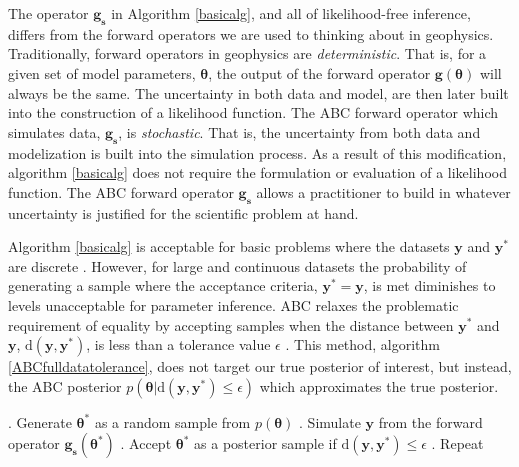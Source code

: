 The operator $\bm{g_s}$ in Algorithm \ref{basicalg}, and all of likelihood-free inference, differs from the forward operators we are used to thinking about in geophysics. Traditionally, forward operators in geophysics are \textit{deterministic}. That is, for a given set of model parameters, $\bm{\theta}$, the output of the forward operator $\bm{g}(\bm{\theta})$ will always be the same. The uncertainty in both data and model, are then later built into the construction of a likelihood function. The ABC forward operator which simulates data, $\bm{g_s}$, is \textit{stochastic}. That is, the uncertainty from both data and modelization is built into the simulation process. As a result of this modification, algorithm \ref{basicalg} does not require the formulation or evaluation of a likelihood function. The ABC forward operator $\bm{g_s}$ allows a practitioner to build in whatever uncertainty is justified for the scientific problem at hand. \par

Algorithm \ref{basicalg} is acceptable for basic problems where the datasets $\bm{y}$ and $\bm{y^*}$ are discrete \citep{Tavare1997,Fu1997}. However, for large and continuous datasets the probability of generating a sample where the acceptance criteria, $\bm{y^*} = \bm{y}$, is met diminishes to levels unacceptable for parameter inference. ABC relaxes the problematic requirement of equality by accepting samples when the distance between $\bm{y^*}$ and $\bm{y}$, $\text{d}(\bm{y},\bm{y^*})$, is less than a tolerance value $\epsilon$ \citep{Weiss1998a}. This method, algorithm \ref{ABCfulldatatolerance}, does not target our true posterior of interest, but instead, the ABC posterior $p(\bm{\theta}|\text{d}(\bm{y},\bm{y^*})\leq\epsilon)$ which approximates the true posterior. 

\begin{algorithm}[H]
	\caption{ }
	\begin{algorithmic}
		. Generate $\bm{\theta^*}$ as a random sample from $p(\bm{\theta})$		
		. Simulate $\bm{y}$ from the forward operator $\bm{g_s}(\bm{\theta^*})$		
		. Accept $\bm{\theta^*}$ as a posterior sample if $\text{d}(\bm{y},\bm{y^*})\leq\epsilon$		
		. Repeat
	\end{algorithmic}
	\label{ABCfulldatatolerance}
\end{algorithm}

